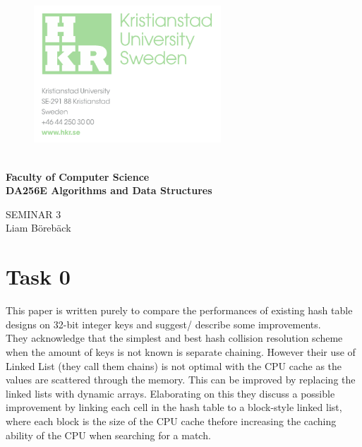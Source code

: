 \documentclass{article}
\begin{document}
	

	\begin{figure}[h!]

			\includegraphics[width=7cm]{images/hkr.png}
			\label{title}
	   \endminipage
		\endminipage
	\end{figure}
	
	\vspace{0.8cm}
	\Large

	\textbf{\\ Faculty of Computer Science\\ DA256E Algorithms and Data Structures}
	\begin{center}
	\vspace{4cm}
	\Huge
	SEMINAR 3\\
	\vspace{2cm}
	\LARGE
	Liam Börebäck
	\end{center}
	
\thispagestyle{empty}       %

\newpage
	
\tableofcontents
\large
\thispagestyle{empty}        %

\newpage
\listoffigures

\newpage

\newpage 

\section{Task 0}

This paper is written purely to compare the performances of existing hash table designs on 32-bit integer keys and suggest/ describe some improvements. \\

They acknowledge that the simplest and best hash collision resolution scheme when the amount of keys is not known is separate chaining. However their use of Linked List (they call them chains) is not optimal with the CPU cache as the values are scattered through the memory. This can be improved by replacing the linked lists with dynamic arrays. Elaborating on this they discuss a possible improvement by linking each cell in the hash table to a block-style linked list, where each block is the size of the CPU cache thefore increasing the caching ability of the CPU when searching for a match. \\
\end{document}
